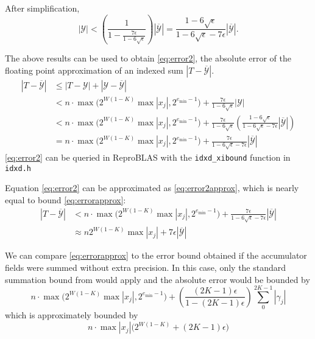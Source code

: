     After simplification,
    \[
      |\mathcal{Y}| < \left(\frac{1}{1 - \frac{7\epsilon}{1 - 6\sqrt\epsilon}}\right)  \left|\overline{\mathcal{Y}}\right| \nonumber 
      = \frac{1 - 6 \sqrt\epsilon}{1 - 6 \sqrt \epsilon - 7\epsilon}  \left|\overline{\mathcal{Y}}\right|.
    \]

    The above results can be used to obtain  \eqref{eq:error2}, the absolute
    error of the floating point approximation of an indexed sum $|T -
    \overline{\mathcal{Y}}|$.
    \begin{align}
      \left|T - \overline{\mathcal{Y}}\right| &\leq |T - \mathcal{Y}| + \left|\mathcal{Y} - \overline{\mathcal{Y}}\right| \nonumber \\
      &< n \cdot \max\bigl(2^{W(1-K)}  \max|x_j|, 2^{e_{\min} - 1}\bigr) + \frac{7\epsilon}{1 - 6\sqrt\epsilon}|\mathcal{Y}| \nonumber \\
      &< n \cdot \max\bigl(2^{W(1-K)}  \max|x_j|, 2^{e_{\min} - 1}\bigr) + \frac{7\epsilon}{1 - 6\sqrt\epsilon}\left(\frac{1 - 6 \sqrt\epsilon}{1 - 6 \sqrt \epsilon - 7\epsilon}\left|\overline{\mathcal{Y}}\right|\right) \nonumber \\
      &= n \cdot \max\bigl(2^{W(1-K)}  \max|x_j|, 2^{e_{\min} - 1}\bigr) + \frac{7\epsilon}{1 - 6 \sqrt \epsilon - 7\epsilon}\left|\overline{\mathcal{Y}}\right|
      \label{eq:error2}
    \end{align}
    \eqref{eq:error2} can be queried in ReproBLAS with the \texttt{idxd\_xibound} function in \texttt{idxd.h}


    Equation \eqref{eq:error2} can be approximated as \eqref{eq:error2approx},
    which is nearly equal to bound \eqref{eq:errorapprox}:
    \begin{align}
      |T - \overline{\mathcal{Y}}| &< n \cdot \max\bigl(2^{W(1-K)}  \max|x_j|, 2^{e_{\min} - 1}\bigr) + \frac{7\epsilon}{1 - 6 \sqrt \epsilon - 7\epsilon}  \left|\overline{\mathcal{Y}}\right| \nonumber \\
      &\approx n  2^{W(1 - K)} \max|x_j|+ 7 \epsilon \left|\overline{\mathcal{Y}}\right|
      \label{eq:error2approx}
    \end{align}

    We can compare  \eqref{eq:errorapprox} to the error bound obtained if the
    accumulator fields were summed without extra precision. In this case, only
    the standard summation bound from \cite{higham} would apply and the
    absolute error would be bounded by
    \begin{equation*}
    n \cdot \max\bigl(2^{W(1-K)}  \max|x_j|, 2^{e_{\min} - 1}\bigr) + \left(\frac{(2  K - 1)  \epsilon}{1 - (2  K - 1)  \epsilon}\right)  \sum\limits_0^{2  K - 1}|\gamma_j|
    \end{equation*}
    which is approximately bounded by
    \begin{equation}
    n \cdot \max|x_j| \bigl(2^{W(1-K)} + (2  K - 1)  \epsilon\bigr)
    \label{eq:baderrorapprox}
    \end{equation}

